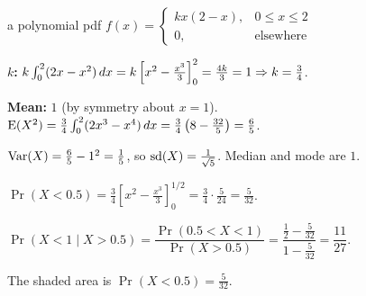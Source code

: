 \begin{cols}[0.6]
\begin{example}{a polynomial pdf \byhand}
$f(x)=\begin{cases}kx(2-x), & 0\le x\le2\\0, & \text{elsewhere}\end{cases}$\par
\textbf{$k$:} $k\int_0^2(2x-x^2)\,dx=k\left[x^2-\frac{x^3}{3}\right]_0^2=\frac{4k}{3}=1\Rightarrow k=\frac34$.\par
\textbf{Mean:} $1$ (by symmetry about $x=1$). \ $\mathrm{E}(X^2)=\frac34\int_0^2(2x^3-x^4)\,dx=\frac34\left(8-\frac{32}{5}\right)=\frac65$.\par
$\mathrm{Var}(X)=\frac65-1^2=\frac15$, so $\mathrm{sd}(X)=\frac{1}{\sqrt5}$. Median and mode are $1$.\par
$\Pr(X<0.5)=\frac34\left[x^2-\frac{x^3}{3}\right]_0^{1/2}=\frac34\cdot\frac{5}{24}=\frac{5}{32}$.\par
$\Pr(X<1\mid X>0.5)=\dfrac{\Pr(0.5<X<1)}{\Pr(X>0.5)}=\dfrac{\frac12-\frac{5}{32}}{1-\frac{5}{32}}=\dfrac{11}{27}$.
\end{example}
\nextcol[0.37]
\centering
{}

{\scriptsize The shaded area is $\Pr(X<0.5)=\frac{5}{32}$.}
\end{cols}

